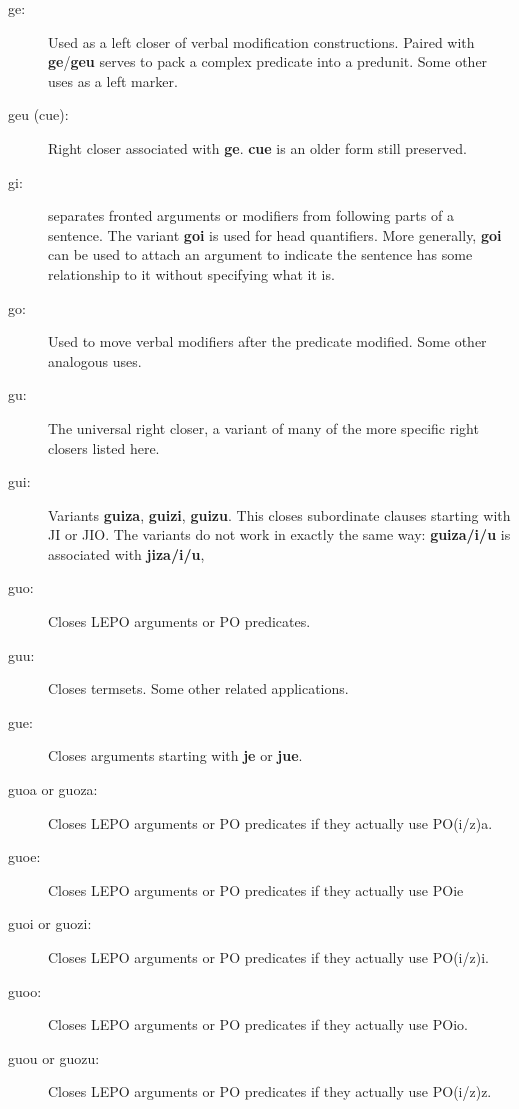 \documentclass[12pt]{book}
\begin{document}
{\begin{description}
\item[ge:]   Used as a left closer of verbal modification constructions.  Paired with {\bf ge}/{\bf geu} serves to pack a complex predicate into a predunit.  Some other uses as a left marker.

\item[geu (cue):]   Right closer associated with {\bf ge}.  {\bf cue} is an older form still preserved.

\item[gi:]  separates fronted arguments or modifiers from following parts of a sentence.  The variant {\bf goi} is used for head quantifiers.  More generally, {\bf goi} can be used to attach an argument to indicate the sentence has some relationship to it without specifying what it is.

\item[go:]  Used to move verbal modifiers after the predicate modified.  Some other analogous uses.

\item[gu:]  The universal right closer, a variant of many of the more specific right closers listed here.

\item[gui:]  Variants {\bf guiza}, {\bf guizi}, {\bf guizu}.  This closes subordinate clauses starting with JI or JIO.
The variants do not work in exactly the same way:  {\bf guiza/i/u} is associated with {\bf jiza/i/u},

\item[guo:]  Closes LEPO arguments or PO predicates.

\item[guu:]  Closes termsets.  Some other related applications.

\item[gue:]   Closes arguments starting with {\bf je} or {\bf jue}.

\item[guoa or guoza:]  Closes LEPO arguments or PO predicates if they actually use PO(i/z)a.

\item[guoe:] Closes LEPO arguments or PO predicates if they actually use POie

\item[guoi or guozi:] Closes LEPO arguments or PO predicates if they actually use PO(i/z)i.

\item[guoo:] Closes LEPO arguments or PO predicates if they actually use POio.

\item[guou or guozu:] Closes LEPO arguments or PO predicates if they actually use PO(i/z)z.


\end{description}}
\end{document}
